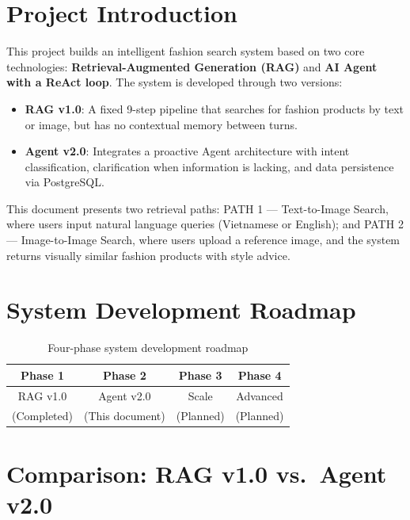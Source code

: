 \section{Project Introduction}
This project builds an intelligent fashion search system based on two core technologies: \textbf{Retrieval-Augmented Generation (RAG)} and \textbf{AI Agent with a ReAct loop}. The system is developed through two versions:
\begin{itemize}
    \item \textbf{RAG v1.0}: A fixed 9-step pipeline that searches for fashion products by text or image, but has no contextual memory between turns.
    \item \textbf{Agent v2.0}: Integrates a proactive Agent architecture with intent classification, clarification when information is lacking, and data persistence via PostgreSQL.
\end{itemize}

This document presents two retrieval paths: PATH 1 --- Text-to-Image Search, where users input natural language queries (Vietnamese or English); and PATH 2 --- Image-to-Image Search, where users upload a reference image, and the system returns visually similar fashion products with style advice.


\section{System Development Roadmap}

\begin{table}[H]
\centering
\begin{tabular}{|c|c|c|c|}
\hline
\textbf{Phase 1} & \textbf{Phase 2} & \textbf{Phase 3} & \textbf{Phase 4}\\
\hline
RAG v1.0    & Agent v2.0          & Scale     & Advanced\\
(Completed) & (This document)     & (Planned) & (Planned)\\
\hline
\end{tabular}
\caption{Four-phase system development roadmap}
\end{table}

\section{Comparison: RAG v1.0 vs.\ Agent v2.0}

